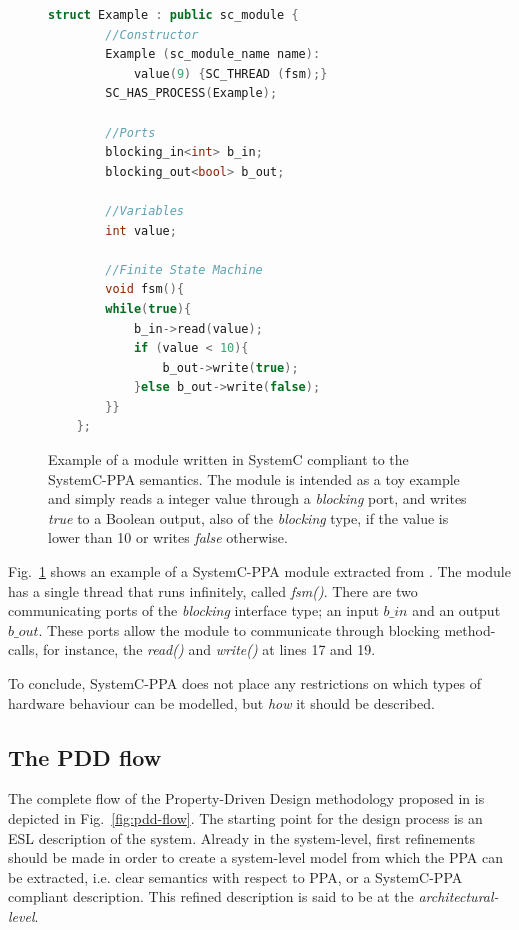 \begin{figure}[htb!]
    \begin{lstlisting}[language=C++]
    struct Example : public sc_module {
        //Constructor
        Example (sc_module_name name):
            value(9) {SC_THREAD (fsm);}
        SC_HAS_PROCESS(Example);
    
        //Ports
        blocking_in<int> b_in;
        blocking_out<bool> b_out;
    
        //Variables
        int value;
    
        //Finite State Machine
        void fsm(){
        while(true){
            b_in->read(value);
            if (value < 10){
                b_out->write(true);
            }else b_out->write(false);
        }}
    };\end{lstlisting}
    \caption{Example of a module written in SystemC compliant to the SystemC-PPA semantics. The module is intended as a toy example and simply reads a integer value through a \textit{blocking} port, and writes \textit{true} to a Boolean output, also of the \textit{blocking} type, if the value is lower than 10 or writes \textit{false} otherwise. }
    \label{fig:sysc-example}
\end{figure}

Fig.~\ref{fig:sysc-example} shows an example of a SystemC-PPA module extracted from \cite{descam}. The module has a single thread that runs infinitely, called\textit{ fsm()}. There are two communicating ports of the \textit{blocking} interface type; an input $b\_in$ and an output $b\_out$. These ports allow the module to communicate through blocking method-calls, for instance, the \textit{read()} and \textit{write()} at lines 17 and 19. 

To conclude, SystemC-PPA does not place any restrictions on which types of hardware behaviour can be modelled, but \textit{how} it should be described.

\subsection{The PDD flow}
\label{subsection:PDD-flow}

The complete flow of the Property-Driven Design methodology proposed in \cite{paper-pdd} is depicted in Fig.~\ref{fig:pdd-flow}. The starting point for the design process is an ESL description of the system. Already in the system-level, first refinements should be made in order to create a system-level model from which the PPA can be extracted, i.e. clear semantics with respect to PPA, or a SystemC-PPA compliant description. This refined description is said to be at the \textit{architectural-level}. 

